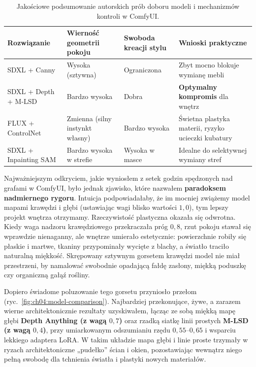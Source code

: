 \begin{table}[htbp]
  \centering
  \caption{Jakościowe podsumowanie autorskich prób doboru modeli i mechanizmów kontroli w ComfyUI.}
  \label{tab:ch04:modele}
  \begin{tabular}{@{}>{\raggedright\arraybackslash}p{}>{\raggedright\arraybackslash}p{}>{\raggedright\arraybackslash}p{}>{\raggedright\arraybackslash}p{}@{}}
    \toprule
    Rozwiązanie & Wierność geometrii pokoju & Swoboda kreacji stylu & Wnioski praktyczne \\
    \midrule
    SDXL + Canny & Wysoka (sztywna) & Ograniczona & Zbyt mocno blokuje wymianę mebli \\
    SDXL + Depth + M-LSD & Bardzo wysoka & Dobra & \textbf{Optymalny kompromis} dla wnętrz \\
    FLUX + ControlNet & Zmienna (silny instynkt własny) & Bardzo wysoka & Świetna plastyka materii, ryzyko ucieczki kubatury \\
    SDXL + Inpainting SAM & Bardzo wysoka w strefie & Wysoka w masce & Idealne do selektywnej wymiany stref \\
    \bottomrule
  \end{tabular}
\end{table}

Najważniejszym odkryciem, jakie wyniosłem z setek godzin spędzonych nad grafami w ComfyUI, było jednak zjawisko, które nazwałem \textbf{paradoksem nadmiernego rygoru}. Intuicja podpowiadałaby, że im mocniej zwiążemy model mapami krawędzi i głębi (ustawiając wagi blisko wartości $1{,}0$), tym lepszy projekt wnętrza otrzymamy. Rzeczywistość plastyczna okazała się odwrotna. Kiedy waga nadzoru krawędziowego przekraczała próg $0{,}8$, rzut pokoju stawał się wprawdzie nienaganny, ale wnętrze umierało estetycznie: powierzchnie robiły się płaskie i martwe, tkaniny przypominały wycięte z blachy, a światło traciło naturalną miękkość. Skrępowany sztywnym gorsetem krawędzi model nie miał przestrzeni, by namalować swobodnie opadającą fałdę zasłony, miękką poduszkę czy organiczną gałąź rośliny.

Dopiero świadome poluzowanie tego gorsetu przyniosło przełom (ryc.~\ref{fig:ch04:model-comparison}). Najbardziej przekonujące, żywe, a zarazem wierne architektonicznie rezultaty uzyskiwałem, łącząc ze sobą miękką mapę głębi \textbf{Depth Anything (z wagą $0{,}7$)} oraz rzadką siatkę linii prostych \textbf{M-LSD (z wagą $0{,}4$)}, przy umiarkowanym odszumianiu rzędu $0{,}55$--$0{,}65$ i wsparciu lekkiego adaptera LoRA. W takim układzie mapa głębi i linie proste trzymały w ryzach architektoniczne „pudełko” ścian i okien, pozostawiając wewnątrz niego pełną swobodę dla tchnienia światła i plastyki nowych materiałów.

